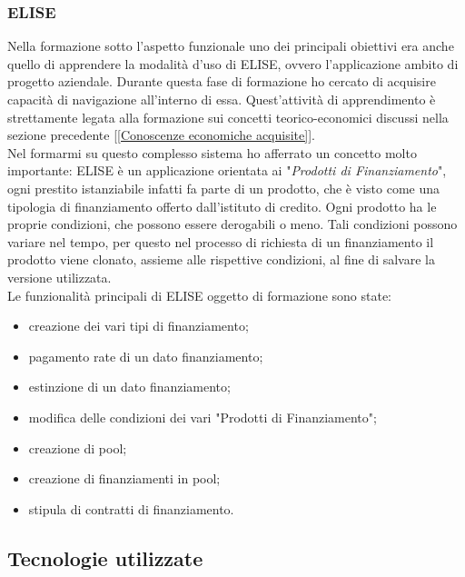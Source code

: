 \subsubsection{ELISE}
\label{ELISE}

Nella formazione sotto l'aspetto funzionale uno dei principali obiettivi era anche quello di apprendere la modalità d'uso di ELISE, ovvero l'applicazione ambito di progetto aziendale. Durante questa fase di formazione ho cercato di acquisire capacità di navigazione all'interno di essa. Quest'attività di apprendimento è strettamente legata alla formazione sui concetti teorico-economici discussi nella sezione precedente [\ref{Conoscenze economiche acquisite}].\\

Nel formarmi su questo complesso sistema ho afferrato un concetto molto importante: ELISE è un applicazione orientata ai "\textit{Prodotti di Finanziamento}", ogni prestito istanziabile infatti fa parte di un prodotto, che è visto come una tipologia di finanziamento offerto dall'istituto di credito. Ogni prodotto ha le proprie condizioni, che possono essere derogabili o meno. Tali condizioni possono variare nel tempo, per questo nel processo di richiesta di un finanziamento il prodotto viene clonato, assieme alle rispettive condizioni, al fine di salvare la versione utilizzata.\\

Le funzionalità principali di ELISE oggetto di formazione sono state:
	\begin{itemize}
	\item creazione dei vari tipi di finanziamento;
	\item pagamento rate di un dato finanziamento;
	\item estinzione di un dato finanziamento;
	\item modifica delle condizioni dei vari "Prodotti di Finanziamento";
	\item creazione di pool;
	\item creazione di finanziamenti in pool;
	\item stipula di contratti di finanziamento.
	\end{itemize}

\subsection{Tecnologie utilizzate}

